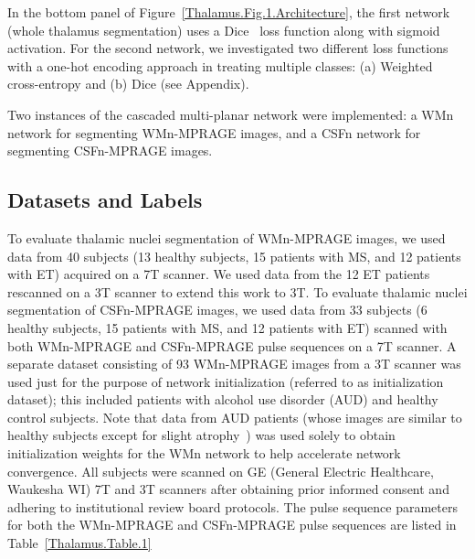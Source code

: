 In the bottom panel of Figure~\ref{Thalamus.Fig.1.Architecture}, the first network (whole thalamus segmentation) uses a Dice~\cite{novikov_Fully_2018} loss function along with sigmoid activation. For the second network, we investigated two different loss functions with a one-hot encoding approach in treating multiple classes: (a) Weighted cross-entropy and (b) Dice (see Appendix).

Two instances of the cascaded multi-planar network were implemented: a WMn network for segmenting WMn-MPRAGE images, and a CSFn network for segmenting CSFn-MPRAGE images.

\subsection{Datasets and Labels}
To evaluate thalamic nuclei segmentation of WMn-MPRAGE images, we used data from 40 subjects (13 healthy subjects, 15 patients with MS, and 12 patients with ET) acquired on a 7T scanner. We used data from the 12 ET patients rescanned on a 3T scanner to extend this work to 3T. To evaluate thalamic nuclei segmentation of CSFn-MPRAGE images, we used data from 33 subjects (6 healthy subjects, 15 patients with MS, and 12 patients with ET) scanned with both WMn-MPRAGE and CSFn-MPRAGE pulse sequences on a 7T scanner. A separate dataset consisting of 93 WMn-MPRAGE images from a 3T scanner was used just for the purpose of network initialization (referred to as initialization dataset); this included patients with alcohol use disorder (AUD) and healthy control subjects. Note that data from AUD patients (whose images are similar to healthy subjects except for slight atrophy~\cite{1921968:27964348}) was used solely to obtain initialization weights for the WMn network to help accelerate network convergence. All subjects were scanned on GE (General Electric Healthcare, Waukesha WI) 7T and 3T scanners after obtaining prior informed consent and adhering to institutional review board protocols. The pulse sequence parameters for both the WMn-MPRAGE and CSFn-MPRAGE pulse sequences are listed in Table~\ref{Thalamus.Table.1}

